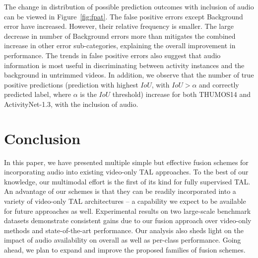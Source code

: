 \documentclass[10pt,twocolumn,letterpaper]{article}
\begin{document}
The change in distribution of possible prediction outcomes with inclusion of audio can be viewed in Figure~\ref{fig:fpat}. The false positive errors except Background error have increased. However, their relative frequency is smaller. The large decrease in number of Background errors more than mitigates the combined increase in other error sub-categories, explaining the overall improvement in performance. The trends in false positive errors also suggest that audio information is most useful in discriminating between activity instances and the background in untrimmed videos. In addition, we observe that the number of true positive predictions  (prediction with highest $IoU$, with $IoU > \alpha$ and correctly predicted label, where $\alpha$ is the $IoU$ threshold) increase for both THUMOS14 and ActivityNet-1.3, with the inclusion of audio.

\section{Conclusion}

In this paper, we have presented multiple simple but effective fusion schemes for incorporating audio into existing video-only TAL approaches. To the best of our knowledge, our multimodal effort is the first of its kind for fully supervised TAL. An advantage of our schemes is that they can be readily incorporated into a variety of video-only TAL architectures -- a capability we expect to be available for future approaches as well. Experimental results on two large-scale benchmark datasets demonstrate consistent gains due to our fusion approach over video-only methods and state-of-the-art performance. Our analysis also sheds light on the impact of audio availability on overall as well as per-class performance. Going ahead, we plan to expand and improve the proposed families of fusion schemes.


{\small


}
\end{document}
